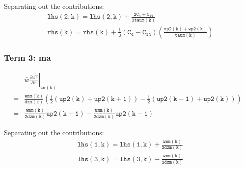 \documentclass[11pt,fleqn]{article}
\newcommand{\ptlder}[2]{\frac{\partial #1}{\partial #2}}
\begin{document}
Separating out the contributions:
%
\begin{equation}
\begin{split}
& \mathtt{ 
  lhs(2,k) = lhs(2,k) + \frac{2 C_{4} + C_{14}}{3 taum(k)}
  } \\
& \mathtt{ 
  rhs(k) = rhs(k) + \frac{1}{3} 
  \left( 
    C_4 - C_{14} 
  \right) 
  \left( 
    \frac{vp2(k) + wp2(k)}{taum(k)}
  \right) 
  }
\end{split}
\end{equation}
%

\subsubsection{Term 3:  ma}

%
\begin{equation}
\begin{split}
& \left. \bar{w}\ptlder{\overline{u^{'2}}}{z} \right|_{\mathtt{zm(k)}} \\
=& \mathtt{ \frac{wmm(k)}{dzm(k)}
   \left(
     \frac{1}{2} \left( up2(k)+up2(k+1) \right)
     - \frac{1}{2} \left( up2(k-1)+up2(k) \right)
   \right) } \\
=& \mathtt{ \frac{wmm(k)}{2 dzm(k)} up2(k+1) - \frac{wmm(k)}{2 dzm(k)} up2(k-1) }
\end{split}
\end{equation}
%

Separating out the contributions:
%
\begin{equation}
\begin{split}
& \mathtt{ lhs(1,k) = lhs(1,k) + \frac{wmm(k)}{2 dzm(k)} } \\
& \mathtt{ lhs(3,k) = lhs(3,k) - \frac{wmm(k)}{2 dzm(k)} }
\end{split}
\end{equation}
%
\end{document}

